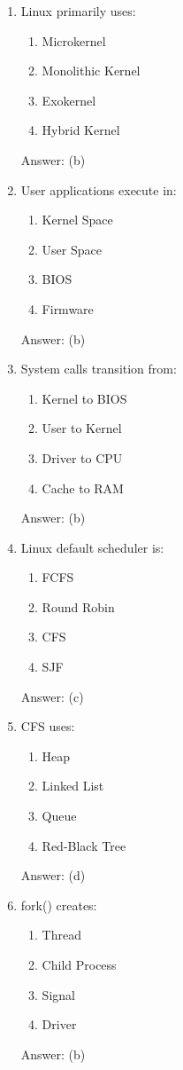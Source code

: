 \begin{enumerate}

\item Linux primarily uses:
\begin{enumerate}[label=(\alph*)]
\item Microkernel
\item Monolithic Kernel
\item Exokernel
\item Hybrid Kernel
\end{enumerate}
Answer: (b)

\item User applications execute in:
\begin{enumerate}[label=(\alph*)]
\item Kernel Space
\item User Space
\item BIOS
\item Firmware
\end{enumerate}
Answer: (b)

\item System calls transition from:
\begin{enumerate}[label=(\alph*)]
\item Kernel to BIOS
\item User to Kernel
\item Driver to CPU
\item Cache to RAM
\end{enumerate}
Answer: (b)

\item Linux default scheduler is:
\begin{enumerate}[label=(\alph*)]
\item FCFS
\item Round Robin
\item CFS
\item SJF
\end{enumerate}
Answer: (c)

\item CFS uses:
\begin{enumerate}[label=(\alph*)]
\item Heap
\item Linked List
\item Queue
\item Red-Black Tree
\end{enumerate}
Answer: (d)

\item fork() creates:
\begin{enumerate}[label=(\alph*)]
\item Thread
\item Child Process
\item Signal
\item Driver
\end{enumerate}
Answer: (b)


\end{enumerate}
